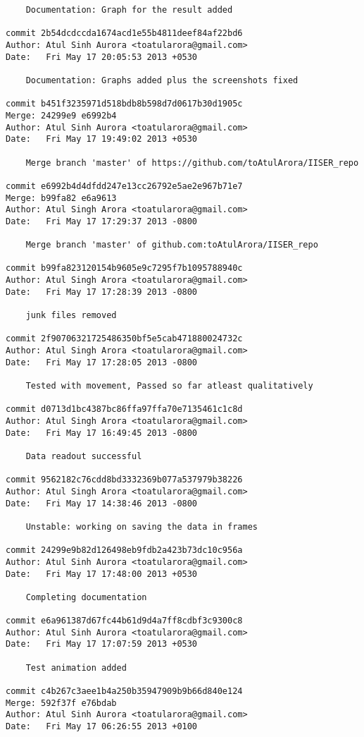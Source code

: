 \begin{lstlisting}
    Documentation: Graph for the result added

commit 2b54dcdccda1674acd1e55b4811deef84af22bd6
Author: Atul Sinh Aurora <toatularora@gmail.com>
Date:   Fri May 17 20:05:53 2013 +0530

    Documentation: Graphs added plus the screenshots fixed

commit b451f3235971d518bdb8b598d7d0617b30d1905c
Merge: 24299e9 e6992b4
Author: Atul Sinh Aurora <toatularora@gmail.com>
Date:   Fri May 17 19:49:02 2013 +0530

    Merge branch 'master' of https://github.com/toAtulArora/IISER_repo

commit e6992b4d4dfdd247e13cc26792e5ae2e967b71e7
Merge: b99fa82 e6a9613
Author: Atul Singh Arora <toatularora@gmail.com>
Date:   Fri May 17 17:29:37 2013 -0800

    Merge branch 'master' of github.com:toAtulArora/IISER_repo

commit b99fa823120154b9605e9c7295f7b1095788940c
Author: Atul Singh Arora <toatularora@gmail.com>
Date:   Fri May 17 17:28:39 2013 -0800

    junk files removed

commit 2f90706321725486350bf5e5cab471880024732c
Author: Atul Singh Arora <toatularora@gmail.com>
Date:   Fri May 17 17:28:05 2013 -0800

    Tested with movement, Passed so far atleast qualitatively

commit d0713d1bc4387bc86ffa97ffa70e7135461c1c8d
Author: Atul Singh Arora <toatularora@gmail.com>
Date:   Fri May 17 16:49:45 2013 -0800

    Data readout successful

commit 9562182c76cdd8bd3332369b077a537979b38226
Author: Atul Singh Arora <toatularora@gmail.com>
Date:   Fri May 17 14:38:46 2013 -0800

    Unstable: working on saving the data in frames

commit 24299e9b82d126498eb9fdb2a423b73dc10c956a
Author: Atul Sinh Aurora <toatularora@gmail.com>
Date:   Fri May 17 17:48:00 2013 +0530

    Completing documentation

commit e6a961387d67fc44b61d9d4a7ff8cdbf3c9300c8
Author: Atul Sinh Aurora <toatularora@gmail.com>
Date:   Fri May 17 17:07:59 2013 +0530

    Test animation added

commit c4b267c3aee1b4a250b35947909b9b66d840e124
Merge: 592f37f e76bdab
Author: Atul Sinh Aurora <toatularora@gmail.com>
Date:   Fri May 17 06:26:55 2013 +0100


\end{lstlisting}
